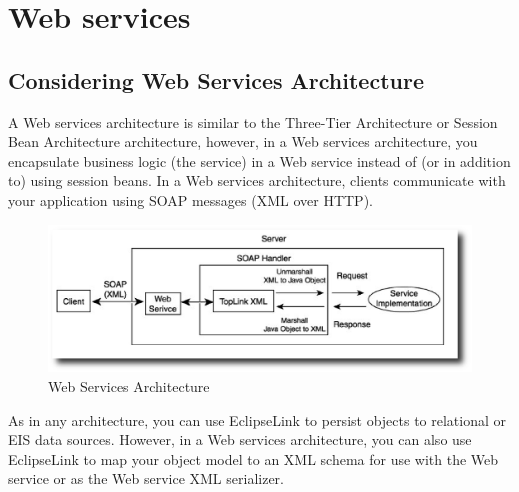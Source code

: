 \section{Web services}
\subsection{Considering Web Services Architecture}
A Web services architecture is similar to the Three-Tier Architecture or Session Bean Architecture architecture, however, in a Web services architecture, you encapsulate business logic (the service) in a Web service instead of (or in addition to) using session beans. In a Web services architecture, clients communicate with your application using SOAP messages (XML over HTTP).

\begin{figure}
  \begin{center}
  \includegraphics[scale=0.6]{Figures/Web_Service_Arch.eps}
  \end{center}
  \caption{Web Services Architecture}
  \label{Web Services Architecture}
\end{figure}

As in any architecture, you can use EclipseLink to persist objects to relational or EIS data sources. However, in a Web services architecture, you can also use EclipseLink to map your object model to an XML schema for use with the Web service or as the Web service XML serializer.